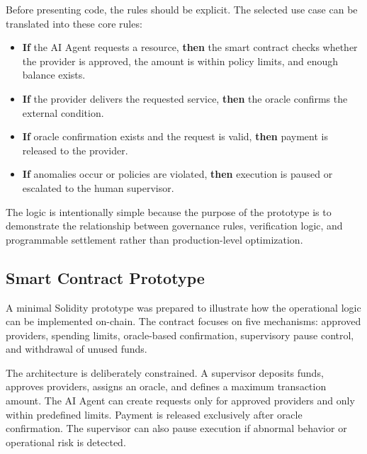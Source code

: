 \documentclass[12pt,a4paper,oneside]{article}
\theoremstyle{definition}
\theoremstyle{plain}
\begin{document}
Before presenting code, the rules should be explicit. The selected use case can be translated into these core rules:

\begin{itemize}[leftmargin=1.2cm]
\item \textbf{If} the AI Agent requests a resource, \textbf{then} the smart contract checks whether the provider is approved, the amount is within policy limits, and enough balance exists.
\item \textbf{If} the provider delivers the requested service, \textbf{then} the oracle confirms the external condition.
\item \textbf{If} oracle confirmation exists and the request is valid, \textbf{then} payment is released to the provider.
\item \textbf{If} anomalies occur or policies are violated, \textbf{then} execution is paused or escalated to the human supervisor.
\end{itemize}

The logic is intentionally simple because the purpose of the prototype is to demonstrate the relationship between governance rules, verification logic, and programmable settlement rather than production-level optimization.


\subsection{Smart Contract Prototype}

A minimal Solidity prototype was prepared to illustrate how the operational logic can be implemented on-chain. The contract focuses on five mechanisms: approved providers, spending limits, oracle-based confirmation, supervisory pause control, and withdrawal of unused funds.

The architecture is deliberately constrained. A supervisor deposits funds, approves providers, assigns an oracle, and defines a maximum transaction amount. The AI Agent can create requests only for approved providers and only within predefined limits. Payment is released exclusively after oracle confirmation. The supervisor can also pause execution if abnormal behavior or operational risk is detected.
\end{document}
